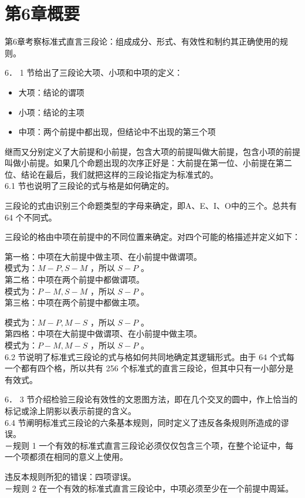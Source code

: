 \section*{第6章概要}
第6章考察标准式直言三段论：组成成分、形式、有效性和制约其正确使用的规则。

6． 1 节给出了三段论大项、小项和中项的定义：

\begin{itemize}
  \item 大项：结论的谓项
  \item 小项：结论的主项
  \item 中项：两个前提中都出现，但结论中不出现的第三个项
\end{itemize}

继而又分别定义了大前提和小前提，包含大项的前提叫做大前提，包含小项的前提叫做小前提。如果几个命题出现的次序正好是：大前提在第一位、小前提在第二位、结论在最后，我们就把这样的三段论指定为标准式的。\\
6.1 节也说明了三段论的式与格是如何确定的。

三段论的式由识别三个命题类型的字母来确定，即A、E、I、O中的三个。总共有 64 个不同式。

三段论的格由中项在前提中的不同位置来确定。对四个可能的格描述并定义如下：

第一格：中项在大前提中做主项、在小前提中做谓项。\\
模式为：$M-P, S-M$ ，所以 $S-P$ 。\\
第二格：中项在两个前提中都做谓项。\\
模式为：$P-M, S-M$ ，所以 $S-P$ 。\\
第三格：中项在两个前提中都做主项。

模式为：$M-P, M-S$ ，所以 $S-P$ 。\\
第四格：中项在大前提中做谓项、在小前提中做主项。\\
模式为：$P-M, M-S$ ，所以 $S-P$ 。\\
6.2 节说明了标准式三段论的式与格如何共同地确定其逻辑形式。由于 64 个式每一个都有四个格，所以共有 256 个标准式的直言三段论，但其中只有一小部分是有效式。

6． 3 节介绍检验三段论有效性的文恩图方法，即在几个交叉的圆中，作上恰当的标记或涂上阴影以表示前提的含义。\\
6.4 节阐明标准式三段论的六条基本规则，同时定义了违反各条规则所造成的谬误。\\
－规则 1 一个有效的标准式直言三段论必须仅仅包含三个项，在整个论证中，每一个项都须在相同的意义上使用。

违反本规则所犯的错误：四项谬误。\\
－规则 2 在一个有效的标准式直言三段论中，中项必须至少在一个前提中周延。

